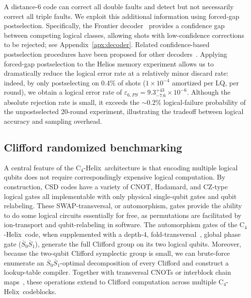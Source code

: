 \documentclass[aps,prx,reprint,showpacs,twocolumn,superscriptaddress,eqsecnum]{revtex4-2}
\newcommand{\chelix}{C$_4$-Helix}
\begin{document}
A distance-6 code can correct all double faults and detect but not necessarily correct all triple faults.
We exploit this additional information using forced-gap postselection. Specifically, the Frontier decoder~\cite{leverrier2026} provides a confidence gap between competing logical classes, allowing shots with low-confidence corrections to be rejected; see Appendix~\ref{apx:decoder}. Related confidence-based postselection procedures have been proposed for other decoders~\cite{gidney2023, lee2026, xie2026, wills2026}. Applying forced-gap postselection to the Helios memory experiment allows us to dramatically reduce the logical error rate at a relatively minor discard rate: indeed, by only postselecting on 0.4\% of shots ($1\times 10^{-4}$ amortized per LQ, per round), we obtain a logical error rate of $\varepsilon_{6,PS} = 9.3^{+43}_{-7.6}\times 10^{-6}$. Although the absolute rejection rate is small, it exceeds the $\sim$0.2\% logical-failure probability of the unpostselected 20-round experiment, illustrating the tradeoff between logical accuracy and sampling overhead.


\subsection{Clifford randomized benchmarking}

A central feature of the \chelix\ architecture is that encoding multiple logical qubits does not require correspondingly expensive logical computation. By construction, CSD codes have a variety of CNOT, Hadamard, and CZ-type logical gates all implementable with only physical single-qubit gates and qubit relabeling. These SWAP-transversal, or automorphism, gates provide the ability to do some logical circuits essentially for free, as permutations are facilitated by ion-transport and qubit-relabeling in software. The automorphism gates of the \chelix\ code, when supplemented with a depth-4, fold-transversal~\cite{Breuckmann_2024}, global phase gate ($\overline{S}_0\overline{S}_1$), generate the full Clifford group on its two logical qubits. Moreover, because the two-qubit Clifford symplectic group is small, we can brute-force enumerate an $\overline{S}_0\overline{S}_1$-optimal decomposition of every Clifford and construct a lookup-table compiler. 
Together with transversal CNOTs or interblock chain maps~\cite{benhemou2026}, these operations extend to Clifford computation across multiple \chelix\ codeblocks.
\end{document}
